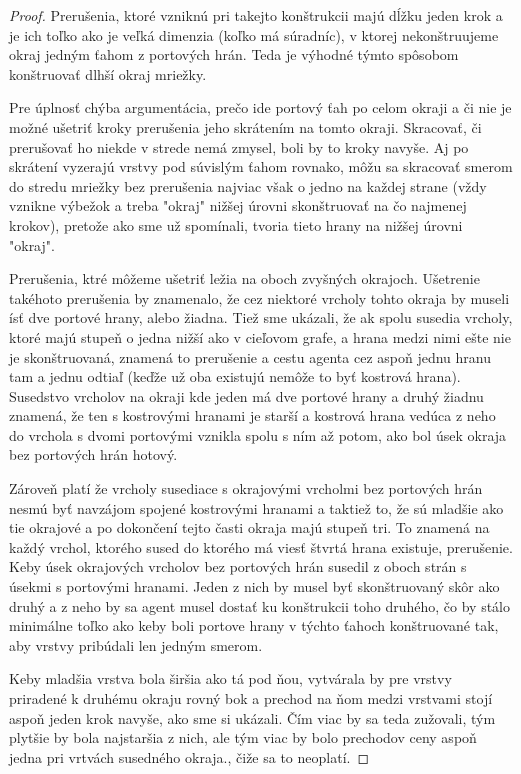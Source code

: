 \begin{proof}
Prerušenia, ktoré vzniknú pri takejto konštrukcii majú dĺžku jeden krok a je
ich toľko ako je veľká dimenzia (koľko má súradníc), v ktorej nekonštruujeme
okraj jedným ťahom z portových hrán. Teda je výhodné týmto spôsobom
konštruovať dlhší okraj mriežky.

Pre úplnosť chýba argumentácia, prečo ide portový ťah po celom okraji a či
nie je možné ušetriť kroky prerušenia jeho skrátením na tomto okraji.
Skracovať, či prerušovať ho niekde v strede nemá zmysel, boli by to kroky
navyše. Aj po skrátení vyzerajú vrstvy pod súvislým ťahom rovnako, môžu sa
skracovať smerom do stredu mriežky bez prerušenia najviac však o jedno na
každej strane (vždy vznikne výbežok a treba "okraj" nižšej úrovni
skonštruovať na čo najmenej krokov), pretože ako sme už spomínali, tvoria
tieto hrany na nižšej úrovni "okraj".

Prerušenia, ktré môžeme ušetriť ležia na oboch zvyšných okrajoch. Ušetrenie
takéhoto prerušenia by znamenalo, že cez niektoré vrcholy tohto okraja by
museli ísť dve portové hrany, alebo žiadna. Tiež sme ukázali, že ak spolu
susedia vrcholy, ktoré majú stupeň o jedna nižší ako v cieľovom grafe,
 a hrana medzi nimi ešte nie je skonštruovaná, znamená to prerušenie a cestu
agenta cez aspoň jednu hranu tam a jednu odtiaľ (keďže už oba existujú
nemôže to byť kostrová hrana). Susedstvo vrcholov na okraji kde jeden má dve
portové hrany a druhý žiadnu znamená, že ten s kostrovými hranami je starší
a kostrová hrana vedúca z neho do vrchola s dvomi portovými vznikla spolu s
ním až potom, ako bol úsek okraja bez portových hrán hotový.

Zároveň platí že vrcholy susediace s okrajovými vrcholmi bez portových hrán
nesmú byť navzájom spojené kostrovými hranami a taktiež to, že sú mladšie
ako tie okrajové a po dokončení tejto časti okraja majú stupeň tri. To
znamená na každý vrchol, ktorého sused do ktorého má viesť štvrtá hrana
existuje, prerušenie. Keby úsek okrajových vrcholov bez portových hrán
susedil z oboch strán s úsekmi s portovými hranami. Jeden z nich by musel
byť skonštruovaný skôr ako druhý a z neho by sa agent musel dostať ku
konštrukcii toho druhého, čo by stálo minimálne toľko ako keby boli portove
hrany v týchto ťahoch konštruované tak, aby vrstvy pribúdali len jedným
smerom.

Keby mladšia vrstva bola širšia ako tá pod ňou, vytvárala by pre vrstvy
priradené k druhému okraju rovný bok a prechod na ňom medzi vrstvami stojí
aspoň jeden krok navyše, ako sme si ukázali. Čím viac by sa teda zužovali,
tým plytšie by bola najstaršia z nich, ale tým viac by bolo prechodov ceny
aspoň jedna pri vrtvách susedného okraja., čiže sa to neoplatí.


\end{proof}
